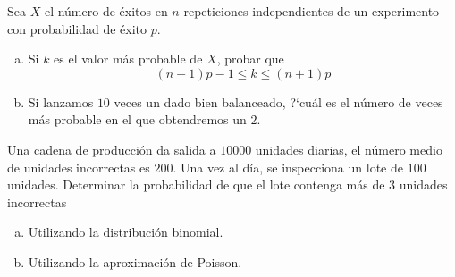 \documentclass[12pt]{article}
\begin{document}

\probl   Sea $X$ el número de éxitos en $n$ repeticiones independientes de un experimento
con probabilidad de éxito $p$.
\begin{enumerate}[a)]
\item  Si $k$ es el valor más probable de $X$, probar que
 $$(n+1)p - 1 \leq k \leq (n+1)p$$
\item  Si lanzamos $10$ veces un dado bien balanceado, ?`cuál es el número de veces más probable
en el que obtendremos un $2$.
\end{enumerate}

\probl  Una cadena de producción da salida a $10000$ unidades diarias,  el número medio de
unidades incorrectas es $200$. Una vez al día, se inspecciona un lote de $100$ unidades.
Determinar la probabilidad de que el lote contenga más de $3$ unidades incorrectas
\begin{enumerate}[a)]
\item Utilizando la distribución binomial.
\item Utilizando la aproximación de Poisson.
\end{enumerate}
\end{document}
